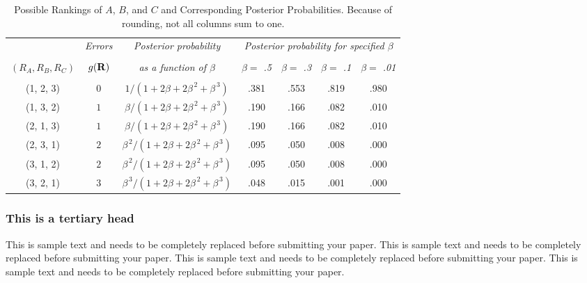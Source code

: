 \documentclass{../../tex_template/asaproc}
\begin{document}
\begin{table*}
\caption{\enspace Possible Rankings of $A$, $B$, and $C$ and Corresponding 
Posterior Probabilities.  Because of rounding, not all columns sum to 
one.}\label{tab1}
\begin{tabular*}{\hsize}{@{\extracolsep{\fill}}ccccccc}
\\[-5pt]
                 & 
\multicolumn{1}{c}{\it Errors} & 
\multicolumn{1}{c}{\it Posterior probability} & 
\multicolumn{4}{c}{\it Posterior probability for specified $\beta$}\\
\cline{4-7}
\\[-7pt]
\multicolumn{1}{c}{\it $(R_A,R_B,R_C)$}  & 
\multicolumn{1}{c}{\it $g({\bf R})$} & 
\multicolumn{1}{c}{\it as a function of $\beta$} & 
\multicolumn{1}{c}{\it $\beta =$ .5} & 
\multicolumn{1}{c}{\it $\beta =$ .3} & 
\multicolumn{1}{c}{\it $\beta =$ .1} & 
\multicolumn{1}{c}{\it $\beta =$ .01}\\
\hline
\\[-5pt]
(1, 2, 3)& $0$ & $1 / (1 + 2\beta + 2\beta^{\,2} + \beta^{\,3})$ & 
        .381 & .553 & .819 & .980 \\ 
(1, 3, 2)& $1$ & $\beta/ (1 + 2\beta + 2\beta^{\,2} + \beta^{\,3})$ & 
        .190 & .166 & .082 & .010 \\
(2, 1, 3)& $1$ & $\beta/ (1 + 2\beta + 2\beta^{\,2} + \beta^{\,3})$ & 
        .190 & .166 & .082 & .010 \\
(2, 3, 1)& $2$ & $\beta^{\,2}/ (1 + 2\beta + 2\beta^{\,2} + \beta^{\,3})$ & 
        .095 & .050 & .008 & .000 \\
(3, 1, 2)& $2$ & $\beta^{\,2}/ (1 + 2\beta + 2\beta^{\,2} + \beta^{\,3})$ &  
         .095 &  .050 &  .008 &  .000 \\
(3, 2, 1)& $3$ & $\beta^{\,3}/ (1 + 2\beta + 2\beta^{\,2} + \beta^{\,3})$ & 
         .048 &  .015 &  .001 &   .000 \\
\hline
\end{tabular*}
\end{table*} 

\subsubsection{This is a tertiary head} 

This is sample text and needs to be completely replaced before submitting your paper. This is sample text and needs to be completely replaced before submitting your paper. This is sample text and needs to be completely replaced before submitting your paper. This is sample text and needs to be completely replaced before submitting your paper.
\end{document}
